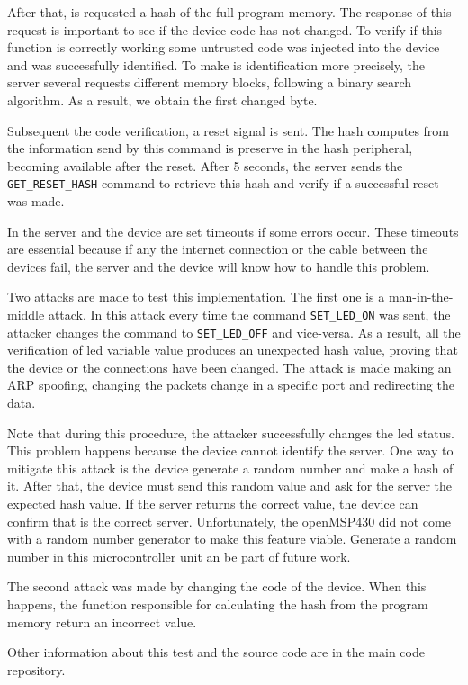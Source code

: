 After that,  is requested a hash of the full program memory. The response of this request is important to see if the device code has not changed. To verify if this function is correctly working some untrusted code was injected into the device and was successfully identified. To make is identification more precisely, the server several requests different memory blocks, following a binary search algorithm. As a result, we obtain the first changed byte. 


Subsequent the code verification,  a reset signal is sent. The hash computes from the information send by this command is preserve in the hash peripheral, becoming available after the reset. After 5 seconds, the server sends the \verb|GET_RESET_HASH| command to retrieve this hash and verify if a successful reset was made.

In the server and the device are set timeouts if some errors occur. These timeouts are essential because if any the internet connection or the cable between the devices fail, the server and the device will know how to handle this problem. 

Two attacks are made to test this implementation. The first one is a man-in-the-middle attack. In this attack every time the command \verb|SET_LED_ON| was sent, the attacker changes the command to \verb|SET_LED_OFF| and vice-versa. As a result, all the verification of led variable value produces an unexpected hash value, proving that the device or the connections have been changed. The attack is made making an ARP spoofing, changing the packets change in a specific port and redirecting the data.

Note that during this procedure, the attacker successfully changes the led status. This problem happens because the device cannot identify the server. One way to mitigate this attack is the device generate a random number and make a hash of it. After that, the device must send this random value and ask for the server the expected hash value. If the server returns the correct value, the device can confirm that is the correct server. Unfortunately, the openMSP430 did not come with a random number generator to make this feature viable. Generate a random number in this microcontroller unit an be part of future work.

The second attack was made by changing the code of the device. When this happens, the function responsible for calculating the hash from the program memory return an incorrect value. 

Other information about this test and the source code are in the main code repository.


